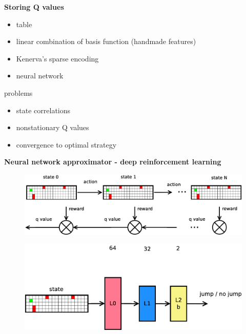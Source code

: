\documentclass[xcolor=dvipsnames]{beamer}
\begin{document}
\begin{frame}{\bf Storing Q values}

\begin{itemize}
 \item table
 \item linear combination of basis function (handmade features)
 \item Kenerva's sparse encoding
 \item neural network
\end{itemize}

problems
\begin{itemize}
 \item state correlations
 \item nonstationary Q values
 \item convergence to optimal strategy
\end{itemize}

\end{frame}


\begin{frame}{\bf Neural network approximator - deep reinforcement learning}

\begin{figure}[htbp]
  \centering
  \includegraphics[scale=0.3]{../../diagrams/rl_nn_learn.png}
\end{figure}


\begin{figure}[htbp]
  \centering
  \includegraphics[scale=0.3]{../../diagrams/fnn.png}
\end{figure}

\end{frame}
\end{document}

